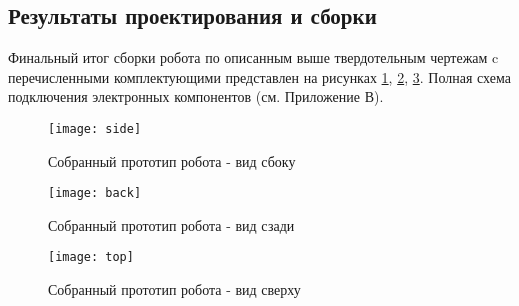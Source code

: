 \subsection{Результаты проектирования и сборки}\label{C4_4_5}

Финальный итог сборки робота по описанным выше твердотельным чертежам c перечисленными комплектующими представлен на  рисунках \ref{side}, \ref{back}, \ref{top}. Полная схема подключения электронных компонентов (см. Приложение В).
\newpage
\begin{figure}[h!]
	\begin{center}
		\texttt{[image: side]}
		\caption{Собранный прототип робота - вид сбоку}
		\label{side}
	\end{center}
\end{figure}

\begin{figure}[h!]
	\begin{center}
		\texttt{[image: back]}
		\caption{Собранный прототип робота - вид сзади}
		\label{back}
	\end{center}
\end{figure}
\newpage
\begin{figure}[h!]
	\begin{center}
		\texttt{[image: top]}
		\caption{Собранный прототип робота - вид сверху}
		\label{top}
	\end{center}
\end{figure}